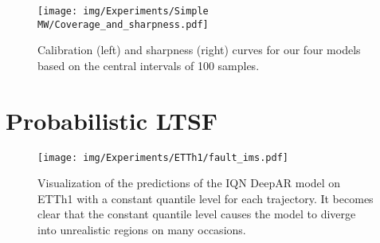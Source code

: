 \documentclass[a4paper,oneside,bibliography=totoc]{scrbook}
\begin{document}
\begin{figure}
\centering
\texttt{[image: img/Experiments/Simple MW/Coverage\_and\_sharpness.pdf]}
\caption{Calibration (left) and sharpness (right) curves for our four models based on the central intervals of 100 samples.}
\label{fig:sw_cov_sha_intervals}
\end{figure}
\clearpage
\section{Probabilistic LTSF}

\begin{figure}[h]
    \centering
    \texttt{[image: img/Experiments/ETTh1/fault\_ims.pdf]}
    \caption{Visualization of the predictions of the IQN DeepAR model on ETTh1 with a constant quantile level for each trajectory. It becomes clear that the constant quantile level causes the model to diverge into unrealistic regions on many occasions.}
    \label{fig:iqn_deepar_diverges}
\end{figure}
\end{document}
